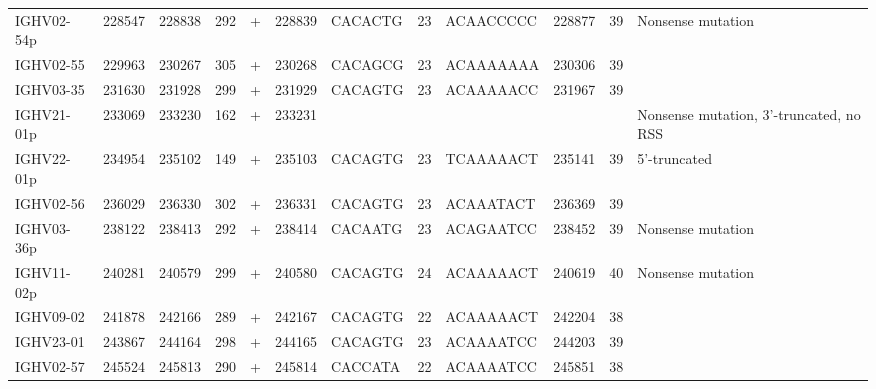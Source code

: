 \begin{tabular}{lrrrlrlllrrl}
  IGHV02-54p & 228547 & 228838 & 292 & + & 228839 & CACACTG & 23 & ACAACCCCC & 228877 & 39 & Nonsense mutation \\ 
  IGHV02-55 & 229963 & 230267 & 305 & + & 230268 & CACAGCG & 23 & ACAAAAAAA & 230306 & 39 &  \\ 
  IGHV03-35 & 231630 & 231928 & 299 & + & 231929 & CACAGTG & 23 & ACAAAAACC & 231967 & 39 &  \\ 
  IGHV21-01p & 233069 & 233230 & 162 & + & 233231 &  &  &  &  &  & Nonsense mutation, 3'-truncated, no RSS \\ 
  IGHV22-01p & 234954 & 235102 & 149 & + & 235103 & CACAGTG & 23 & TCAAAAACT & 235141 & 39 & 5'-truncated \\ 
  IGHV02-56 & 236029 & 236330 & 302 & + & 236331 & CACAGTG & 23 & ACAAATACT & 236369 & 39 &  \\ 
  IGHV03-36p & 238122 & 238413 & 292 & + & 238414 & CACAATG & 23 & ACAGAATCC & 238452 & 39 & Nonsense mutation \\ 
  IGHV11-02p & 240281 & 240579 & 299 & + & 240580 & CACAGTG & 24 & ACAAAAACT & 240619 & 40 & Nonsense mutation \\ 
  IGHV09-02 & 241878 & 242166 & 289 & + & 242167 & CACAGTG & 22 & ACAAAAACT & 242204 & 38 &  \\ 
  IGHV23-01 & 243867 & 244164 & 298 & + & 244165 & CACAGTG & 23 & ACAAAATCC & 244203 & 39 &  \\ 
  IGHV02-57 & 245524 & 245813 & 290 & + & 245814 & CACCATA & 22 & ACAAAATCC & 245851 & 38 &  \\ 
   \bottomrule \end{tabular}
